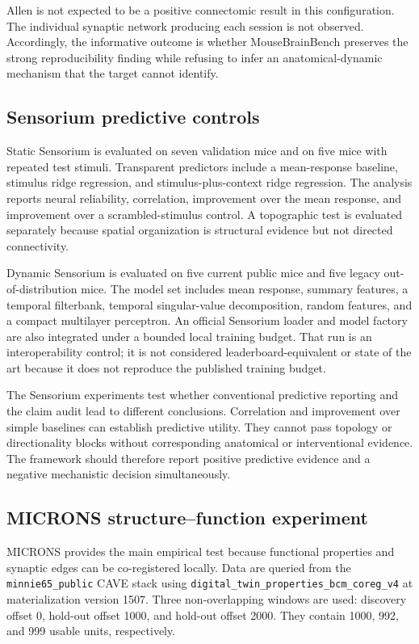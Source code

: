 Allen is not expected to be a positive connectomic result in this configuration.
The individual synaptic network producing each session is not observed.
Accordingly, the informative outcome is whether MouseBrainBench preserves the
strong reproducibility finding while refusing to infer an anatomical-dynamic
mechanism that the target cannot identify.

\subsection{Sensorium predictive controls}
\label{subsec:sensorium-predictive-controls}

Static Sensorium is evaluated on seven validation mice and on five mice with
repeated test stimuli. Transparent predictors include a mean-response baseline,
stimulus ridge regression, and stimulus-plus-context ridge regression. The
analysis reports neural reliability, correlation, improvement over the mean
response, and improvement over a scrambled-stimulus control. A topographic test
is evaluated separately because spatial organization is structural evidence but
not directed connectivity.

Dynamic Sensorium is evaluated on five current public mice and five legacy
out-of-distribution mice. The model set includes mean response, summary
features, a temporal filterbank, temporal singular-value decomposition, random
features, and a compact multilayer perceptron. An official Sensorium loader and
model factory are also integrated under a bounded local training budget. That
run is an interoperability control; it is not considered leaderboard-equivalent
or state of the art because it does not reproduce the published training budget.

The Sensorium experiments test whether conventional predictive reporting and
the claim audit lead to different conclusions. Correlation and improvement over
simple baselines can establish predictive utility. They cannot pass topology or
directionality blocks without corresponding anatomical or interventional
evidence. The framework should therefore report positive predictive evidence
and a negative mechanistic decision simultaneously.

\subsection{MICRONS structure--function experiment}
\label{subsec:microns-structure-function-experiment}

MICRONS provides the main empirical test because functional properties and
synaptic edges can be co-registered locally. Data are queried from the
\texttt{minnie65\_public} CAVE stack using
\texttt{digital\_twin\_properties\_bcm\_coreg\_v4} at materialization
version 1507. Three non-overlapping windows are used: discovery offset 0,
hold-out offset 1000, and hold-out offset 2000. They contain 1000, 992, and 999
usable units, respectively.

